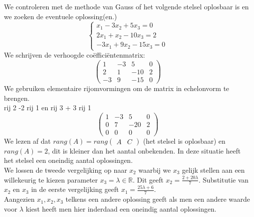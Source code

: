 \begin{voorbeeld}
		We controleren met de methode van Gauss of het volgende stelsel oplosbaar is en we zoeken de eventuele oplossing(en.)
\[ \left\{ 
	\begin{array}{l}
	x_1 -3x_2 +5x_3  = 0 \\
	2x_1 + x_2 -10x_3 = 2 \\
	-3x_1 + 9x_2 -15x_3= 0 \end{array} 
	\right. \]
	We schrijven de verhoogde co\"{e}ffici\"{e}ntenmatrix:
	\[ \left(
	\begin{array}{ccc|c}
	1 & -3 & 5 & 0 \\
	2 & 1 & -10 & 2 \\
	-3 & 9 & -15 & 0 \end{array} \right) 
	\]
	We gebruiken elementaire rijomvormingen om de matrix in echelonvorm te brengen. \\
	
	rij 2 -2 rij 1 en rij 3 + 3 rij 1 
	\[ \left(
	\begin{array}{ccc|c}
	1 & -3 & 5 & 0 \\
	0 & 7 & -20 & 2 \\
	0 & 0 & 0 & 0
	\end{array} \right)
	\]
	We lezen af dat $rang(A)=rang \left( \begin{array}{c|c} A & C \end{array} \right)$ (het stelsel is oplosbaar) en $rang(A)=2$, dit is kleiner dan het aantal onbekenden. 
	In deze situatie heeft het stelsel een oneindig aantal oplossingen. \\
	We lossen de tweede vergelijking op naar $x_2$ waarbij we $x_3$ gelijk stellen aan een willekeurig te kiezen parameter $x_3 = \lambda \in \mathbb{R}$. Dit geeft $x_2 = \frac{2+20 \lambda}{7}$. Substitutie van $x_2$ en $x_3$ in de eerste vergelijking geeft $x_1 =\frac{25 \lambda + 6}{7}$. \\
	Aangezien $x_1, x_2, x_3$ telkens een andere oplossing geeft als men een andere waarde voor $\lambda$ kiest heeft men hier inderdaad een oneindig aantal oplossingen.


\end{voorbeeld} 

